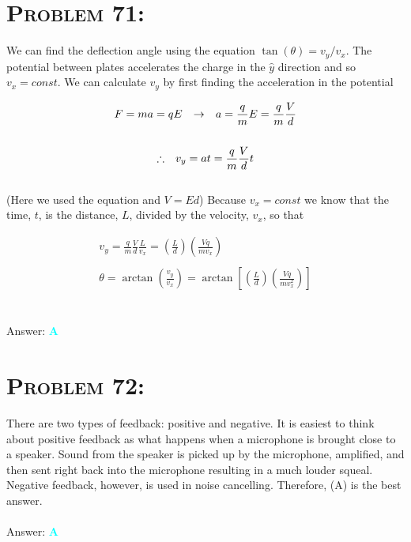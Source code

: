 \documentclass{article}
\begin{document}

\section{\textsc{Problem 71:}} We can find the deflection angle using the equation $\tan{(\theta)} = v_{y}/v_{x}$. The potential between plates accelerates the charge in the $\hat{y}$ direction and so $v_{x} = const$. We can calculate $v_{y}$ by first finding the acceleration in the potential

\begin{gather}
F = ma = qE \hspace{.1in} \rightarrow \hspace{.1in} a = \frac{q}{m} E =  \frac{q}{m} \frac{V}{d}\nonumber\\
\nonumber\\
\therefore \hspace{.1in} v_{y} = a t =  \frac{q}{m} \frac{V}{d} t  \nonumber
\end{gather}
\\
(Here we used the equation and $V = Ed$) Because $v_{x} = const$ we know that the time, $t$, is the distance, $L$, divided by the velocity, $v_{x}$, so that  

\begin{gather}
v_{y} =  \frac{q}{m} \frac{V}{d} \frac{L}{v_{x}} = \left(\frac{L}{d}\right) \left(\frac{V q}{m v_{x}}\right) \nonumber\\
\nonumber\\
\theta = \arctan{\left(  \frac{v_{y}}{v_{x}}  \right)} = \boxed{\arctan{\left[ \left(\frac{L}{d}\right) \left(\frac{V q}{m v_{x}^{2}}\right) \right]} } \nonumber
\end{gather}
\\\\
Answer: \textbf{\textcolor{cyan}A}\\


\section{\textsc{Problem 72:}} There are two types of feedback: positive and negative. It is easiest to think about positive feedback as what happens when a microphone is brought close to a speaker. Sound from the speaker is picked up by the microphone, amplified, and then sent right back into the microphone resulting in a much louder squeal. Negative feedback, however, is used in noise cancelling. Therefore, (A) is the best answer.
\\\\
Answer: \textbf{\textcolor{cyan}A}\\
\end{document}
